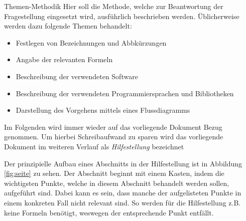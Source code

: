 %
\begin{simplebox}{Themen-Methodik}
%
Hier soll die Methode, welche zur Beantwortung der Fragestellung eingesetzt wird, ausführlich beschrieben werden.
Üblicherweise werden dazu folgende Themen behandelt:
%
\begin{itemize}
\item Festlegen von Bezeichnungen und Abbkürzungen 
\item Angabe der relevanten Formeln 
\item Beschreibung der verwendeten Software 
\item Beschreibung der verwendeten Programmiersprachen und Bibliotheken
\item Darstellung des Vorgehens mittels eines Flussdiagramms 
\end{itemize}
%
\end{simplebox}
%
Im Folgenden wird immer wieder auf das vorliegende Dokument Bezug genommen. 
Um hierbei Schreibaufwand zu sparen wird das vorliegende Dokument im weiteren Verlauf als \textit{Hilfestellung} bezeichnet
\par
Der prinzipielle Aufbau eines Abschnitts in der Hilfestellung ist in Abbildung \ref{fig:seite} zu sehen.
Der Abschnitt beginnt mit einem Kasten, indem die wichtigsten Punkte, welche in diesem Abschnitt behandelt werden sollen, aufgeführt sind.
Dabei kann es sein, dass manche der aufgelisteten Punkte in einem konkreten Fall nicht relevant sind.
So werden für die Hilfestellung z.B. keine Formeln benötigt, weswegen der entsprechende Punkt entfällt. 
%
